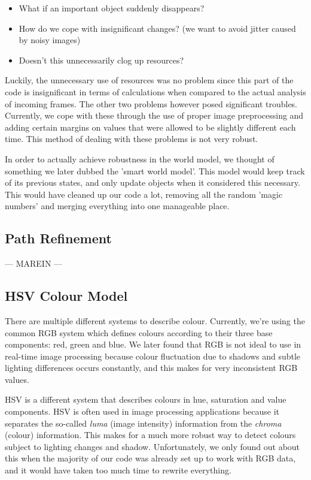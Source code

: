 \documentclass[10pt, abstracton, twocolumn]{scrartcl}
\begin{document}
\begin{appendices}
\begin{itemize}
\item What if an important object suddenly disappears?
\item How do we cope with insignificant changes? (we want to avoid jitter caused by noisy images)
\item Doesn't this unnecessarily clog up resources?
\end{itemize}

Luckily, the unnecessary use of resources was no problem since this part of the code is insignificant in terms of calculations when compared to the actual analysis of incoming frames. The other two problems however posed significant troubles. Currently, we cope with these through the use of proper image preprocessing and adding certain margins on values that were allowed to be slightly different each time. This method of dealing with these problems is not very robust.

In order to actually achieve robustness in the world model, we thought of something we later dubbed the 'smart world model'. This model would keep track of its previous states, and only update objects when it considered this necessary. This would have cleaned up our code a lot, removing all the random 'magic numbers' and merging everything into one manageable place.

\subsection{Path Refinement}
\label{sec:pathrefinement}
---
MAREIN
---

\subsection{HSV Colour Model}
There are multiple different systems to describe colour. Currently, we're using the common RGB system which defines colours according to their three base components: red, green and blue. We later found that RGB is not ideal to use in real-time image processing because colour fluctuation due to shadows and subtle lighting differences occurs constantly, and this makes for very inconsistent RGB values.

HSV is a different system that describes colours in hue, saturation and value components. HSV is often used in image processing applications because it separates the so-called \textit{luma} (image intensity) information from the \textit{chroma} (colour) information. This makes for a much more robust way to detect colours subject to lighting changes and shadow. Unfortunately, we only found out about this when the majority of our code was already set up to work with RGB data, and it would have taken too much time to rewrite everything.


\end{appendices}
\end{document}
